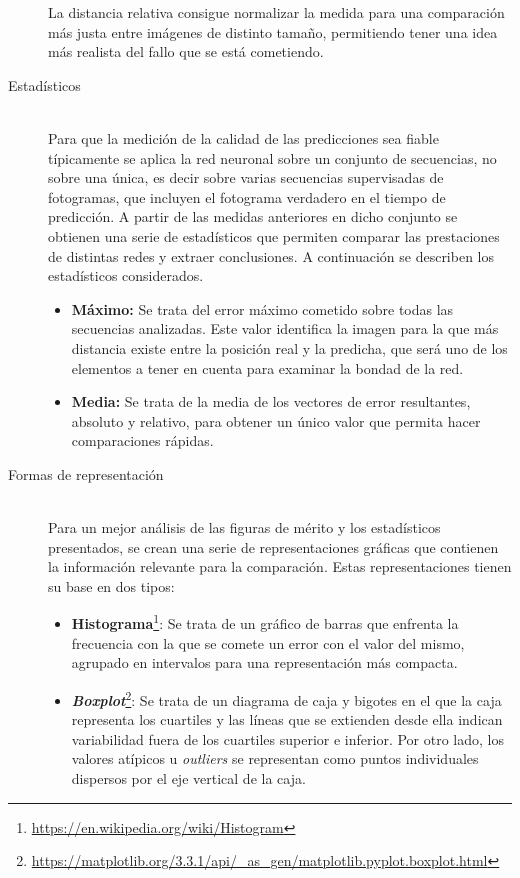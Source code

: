 \begin{description}
La distancia relativa consigue normalizar la medida para una comparación más justa entre imágenes de distinto tamaño, permitiendo tener una idea más realista del fallo que se está cometiendo. 

\vspace{10pt}

\item[Estadísticos] \hfill 
\vspace{10pt}
\\
Para que la medición de la calidad de las predicciones sea fiable típicamente se aplica la red neuronal sobre un conjunto de secuencias, no sobre una única, es decir sobre varias secuencias supervisadas de fotogramas, que incluyen el fotograma verdadero en el tiempo de predicción. A partir de las medidas anteriores en dicho conjunto se obtienen una serie de estadísticos que permiten comparar las prestaciones de distintas redes y extraer conclusiones. A continuación se describen los estadísticos considerados.

\begin{itemize}
    \item \textbf{Máximo:} Se trata del error máximo cometido sobre todas las secuencias analizadas. Este valor identifica la imagen para la que más distancia existe entre la posición real y la predicha, que será uno de los elementos a tener en cuenta para examinar la bondad de la red. 
    \item \textbf{Media:} Se trata de la media de los vectores de error resultantes, absoluto y relativo, para obtener un único valor que permita hacer comparaciones rápidas.
\end{itemize}

\item[Formas de representación] \hfill 
\vspace{10pt}
\\
Para un mejor análisis de las figuras de mérito y los estadísticos presentados, se crean una serie de representaciones gráficas que contienen la información relevante para la comparación. Estas representaciones tienen su base en dos tipos:

\begin{itemize}
    \item \textbf{Histograma}\footnote{\url{https://en.wikipedia.org/wiki/Histogram}}: Se trata de un gráfico de barras que enfrenta la frecuencia con la que se comete un error con el valor del mismo, agrupado en intervalos para una representación más compacta.
    \item \textbf{\textit{Boxplot}}\footnote{\url{https://matplotlib.org/3.3.1/api/_as_gen/matplotlib.pyplot.boxplot.html}}: Se trata de un diagrama de caja y bigotes en el que la caja representa los cuartiles y las líneas que se extienden desde ella indican variabilidad fuera de los cuartiles superior e inferior. Por otro lado, los valores atípicos u \textit{outliers} se representan como puntos individuales dispersos por el eje vertical de la caja.
\end{itemize}


\end{description}
